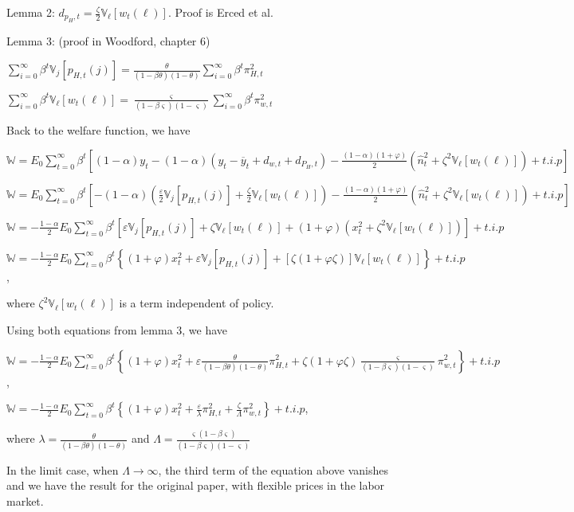 \documentclass[
]{article}
\begin{document}
Lemma 2:
\(\displaystyle d_{p_H,t}=\frac{\zeta}{2}\mathbb{V}_\ell[w_t(\ell)]\).
Proof is Erced et al.

Lemma 3: (proof in Woodford, chapter 6)

\(\displaystyle \sum_{i=0}^{\infty} \beta^t \mathbb{V}_j[p_{H,t}(j)]=\frac{\theta}{(1-\beta\theta)(1-\theta)}\sum_{i=0}^\infty \beta^t \pi_{H,t}^2\)

\(\displaystyle \sum_{i=0}^{\infty} \beta^t \mathbb{V}_\ell[w_t(\ell)]=\frac{\varsigma}{(1-\beta \varsigma)(1-\varsigma)}\sum_{i=0}^\infty \beta^t \pi_{w,t}^2\)

Back to the welfare function, we have

\(\displaystyle \mathbb{W} = E_0 \sum_{t=0}^{\infty} \beta^t \left[ (1-\alpha)y_t- (1-\alpha)(y_t-\overline{y}_t+d_{w,t}+d_{P_H,t}) - \frac{(1-\alpha)(1+\varphi)}{2} (\widehat{n}_t^2+ \zeta^2 \mathbb{V}_\ell[w_t(\ell)]) + t.i.p\right]\)

\(\displaystyle \mathbb{W} = E_0 \sum_{t=0}^{\infty} \beta^t \left[ - (1-\alpha)\left(\frac{\varepsilon}{2}\mathbb{V}_j[p_{H,t}(j)]+ \frac{\zeta}{2}\mathbb{V}_\ell[w_t(\ell)]\right) - \frac{(1-\alpha)(1+\varphi)}{2} (\widehat{n}_t^2+ \zeta^2 \mathbb{V}_\ell[w_t(\ell)]) + t.i.p\right]\)

\(\displaystyle \mathbb{W} = - \frac{1-\alpha}{2} E_0 \sum_{t=0}^{\infty} \beta^t \left[\varepsilon\mathbb{V}_j[p_{H,t}(j)]+ \zeta\mathbb{V}_\ell[w_t(\ell)] + (1+\varphi) (x_t^2+ \zeta^2 \mathbb{V}_\ell[w_t(\ell)])\right] + t.i.p\)

\(\displaystyle \mathbb{W} = - \frac{1-\alpha}{2} E_0 \sum_{t=0}^{\infty} \beta^t \left\{(1+\varphi) x_t^2 + \varepsilon\mathbb{V}_j[p_{H,t}(j)] + [\zeta(1+\varphi \zeta)] \mathbb{V}_\ell[w_t(\ell)]\right\} + t.i.p\),

where \(\zeta^2\mathbb{V}_\ell[w_t(\ell)]\) is a term independent of
policy.

Using both equations from lemma 3, we have

\(\displaystyle \mathbb{W} = - \frac{1-\alpha}{2} E_0 \sum_{t=0}^{\infty} \beta^t \left\{(1+\varphi) x_t^2 + \varepsilon\frac{\theta}{(1-\beta\theta)(1-\theta)}\pi_{H,t}^2 + \zeta(1+\varphi \zeta) \frac{\varsigma}{(1-\beta\varsigma)(1-\varsigma)} \pi_{w,t}^2\right\} + t.i.p\),

\(\displaystyle \mathbb{W} = - \frac{1-\alpha}{2} E_0 \sum_{t=0}^{\infty} \beta^t \left\{(1+\varphi) x_t^2 + \frac{\varepsilon}{\lambda}\pi_{H,t}^2 + \frac{\zeta}{\Lambda} \pi_{w,t}^2\right\} + t.i.p\),

where \(\lambda=\frac{\theta}{(1-\beta\theta)(1-\theta)}\) and
\(\Lambda=\frac{\varsigma (1-\beta \varsigma)}{(1-\beta\varsigma)(1-\varsigma)}\)

In the limit case, when \(\Lambda \to \infty\), the third term of the
equation above vanishes and we have the result for the original paper,
with flexible prices in the labor market.

\vspace{12pt}
\end{document}
